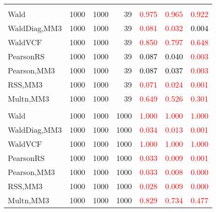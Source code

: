 \documentclass[
]{article}
\begin{document}
\begin{table}[H]
{\begin{tabular}[t]{lrrrrrr}
\addlinespace[0.3em]
\multicolumn{7}{l}{\textbf{2F 10V}}\\
\hspace{1em}Wald & 1000 & 1000 & 39 & \textcolor{red}{0.975} & \textcolor{red}{0.965} & \textcolor{red}{0.922}\\
\hspace{1em}WaldDiag,MM3 & 1000 & 1000 & 39 & \textcolor{red}{0.081} & \textcolor{red}{0.032} & \textcolor{black}{0.004}\\
\hspace{1em}WaldVCF & 1000 & 1000 & 39 & \textcolor{red}{0.850} & \textcolor{red}{0.797} & \textcolor{red}{0.648}\\
\hspace{1em}PearsonRS & 1000 & 1000 & 39 & \textcolor{black}{0.087} & \textcolor{black}{0.040} & \textcolor{red}{0.003}\\
\hspace{1em}Pearson,MM3 & 1000 & 1000 & 39 & \textcolor{black}{0.087} & \textcolor{black}{0.037} & \textcolor{red}{0.003}\\
\hspace{1em}RSS,MM3 & 1000 & 1000 & 39 & \textcolor{red}{0.071} & \textcolor{red}{0.024} & \textcolor{red}{0.001}\\
\hspace{1em}Multn,MM3 & 1000 & 1000 & 39 & \textcolor{red}{0.649} & \textcolor{red}{0.526} & \textcolor{red}{0.301}\\
\addlinespace[0.3em]
\multicolumn{7}{l}{\textbf{3F 15V}}\\
\hspace{1em}Wald & 1000 & 1000 & 1000 & \textcolor{red}{1.000} & \textcolor{red}{1.000} & \textcolor{red}{1.000}\\
\hspace{1em}WaldDiag,MM3 & 1000 & 1000 & 1000 & \textcolor{red}{0.034} & \textcolor{red}{0.013} & \textcolor{red}{0.001}\\
\hspace{1em}WaldVCF & 1000 & 1000 & 1000 & \textcolor{red}{1.000} & \textcolor{red}{1.000} & \textcolor{red}{1.000}\\
\hspace{1em}PearsonRS & 1000 & 1000 & 1000 & \textcolor{red}{0.033} & \textcolor{red}{0.009} & \textcolor{red}{0.001}\\
\hspace{1em}Pearson,MM3 & 1000 & 1000 & 1000 & \textcolor{red}{0.033} & \textcolor{red}{0.008} & \textcolor{red}{0.000}\\
\hspace{1em}RSS,MM3 & 1000 & 1000 & 1000 & \textcolor{red}{0.028} & \textcolor{red}{0.009} & \textcolor{red}{0.000}\\
\hspace{1em}Multn,MM3 & 1000 & 1000 & 1000 & \textcolor{red}{0.829} & \textcolor{red}{0.734} & \textcolor{red}{0.477}\\
\bottomrule
\end{tabular}}
\endgroup{}
\end{table}
\end{document}
